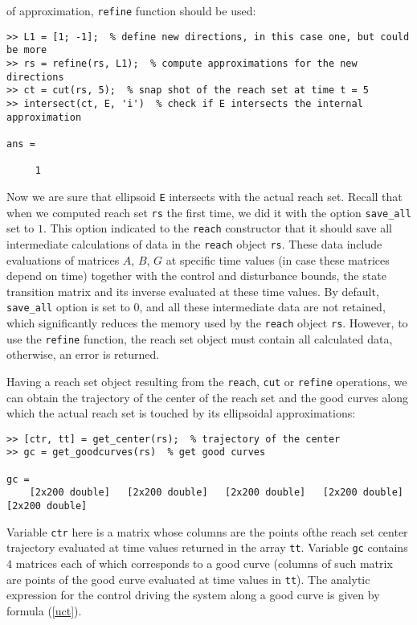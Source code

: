 of approximation, {\tt refine} function should be used:
{\tt \begin{verbatim}
>> L1 = [1; -1];  % define new directions, in this case one, but could be more
>> rs = refine(rs, L1);  % compute approximations for the new directions
>> ct = cut(rs, 5);  % snap shot of the reach set at time t = 5
>> intersect(ct, E, 'i')  % check if E intersects the internal approximation

ans =

     1
\end{verbatim} }
Now we are sure that ellipsoid {\tt E} intersects with the actual reach set.
Recall that when we computed reach set {\tt rs} the first time, we did it
with the option {\tt save\_all} set to $1$. This option indicated to the
{\tt reach} constructor that it should save all intermediate calculations of
data in the {\tt reach} object {\tt rs}. These data include evaluations
of matrices $A$, $B$, $G$ at specific time values (in case these
matrices depend on time) together with the control and disturbance
bounds, the state transition matrix and its inverse evaluated at
these time values.
By default, {\tt save\_all} option is set to $0$, and all these intermediate
data are not retained, which significantly reduces the memory used
by the {\tt reach} object {\tt rs}. However, to use the {\tt refine} function,
the reach set object must contain all calculated data, otherwise, an
error is returned.

Having a reach set object resulting from the {\tt reach}, {\tt cut} or
{\tt refine} operations, we can obtain the trajectory of the center
of the reach set and the good curves along which the actual reach set
is touched by its ellipsoidal approximations:
{\tt \begin{verbatim}
>> [ctr, tt] = get_center(rs);  % trajectory of the center
>> gc = get_goodcurves(rs)  % get good curves

gc =
    [2x200 double]   [2x200 double]   [2x200 double]   [2x200 double]   [2x200 double]
\end{verbatim} }
Variable {\tt ctr} here is a matrix whose columns are the points ofthe
reach set center trajectory evaluated at time values returned in the
array {\tt tt}. Variable {\tt gc} contains $4$ matrices each of which
corresponds to a good curve (columns of such matrix are points of the
good curve evaluated at time values in {\tt tt}).
The analytic expression for the control driving the system along a good
curve is given by formula (\ref{uct}).

